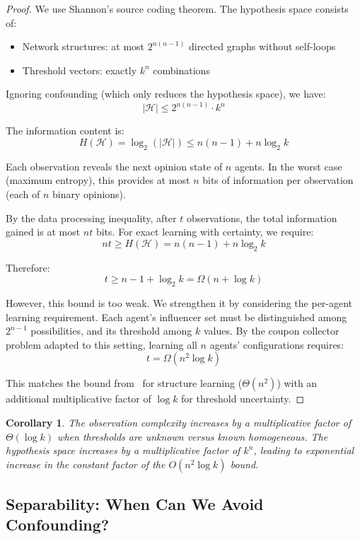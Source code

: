 \documentclass[11pt]{article}
\newtheorem{corollary}{Corollary}
\begin{document}
\begin{proof}
We use Shannon's source coding theorem. The hypothesis space consists of:
\begin{itemize}
\item Network structures: at most $2^{n(n-1)}$ directed graphs without self-loops
\item Threshold vectors: exactly $k^n$ combinations
\end{itemize}

Ignoring confounding (which only reduces the hypothesis space), we have:
\[
|\mathcal{H}| \leq 2^{n(n-1)} \cdot k^n
\]

The information content is:
\[
H(\mathcal{H}) = \log_2(|\mathcal{H}|) \leq n(n-1) + n \log_2 k
\]

Each observation reveals the next opinion state of $n$ agents. In the worst case (maximum entropy), this provides at most $n$ bits of information per observation (each of $n$ binary opinions).

By the data processing inequality, after $t$ observations, the total information gained is at most $nt$ bits. For exact learning with certainty, we require:
\[
nt \geq H(\mathcal{H}) = n(n-1) + n \log_2 k
\]

Therefore:
\[
t \geq n-1 + \log_2 k = \Omega(n + \log k)
\]

However, this bound is too weak. We strengthen it by considering the per-agent learning requirement. Each agent's influencer set must be distinguished among $2^{n-1}$ possibilities, and its threshold among $k$ values. By the coupon collector problem adapted to this setting, learning all $n$ agents' configurations requires:
\[
t = \Omega(n^2 \log k)
\]

This matches the bound from~\cite{chistikov2020convergence} for structure learning ($\Theta(n^2)$) with an additional multiplicative factor of $\log k$ for threshold uncertainty.
\end{proof}

\begin{corollary}
\label{cor:threshold_cost_precise}
The observation complexity increases by a multiplicative factor of $\Theta(\log k)$ when thresholds are unknown versus known homogeneous. The hypothesis space increases by a multiplicative factor of $k^n$, leading to exponential increase in the constant factor of the $O(n^2 \log k)$ bound.
\end{corollary}

\subsection{Separability: When Can We Avoid Confounding?}
\end{document}
